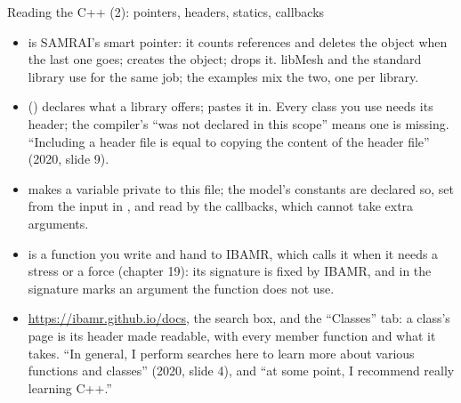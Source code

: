 \documentclass[aspectratio=169,11pt]{beamer}
\begin{document}
\begin{frame}{Reading the C++ (2): pointers, headers, statics, callbacks}
\label{fr:cpp2}
\footnotesize
\begin{itemize}
  \item {} is SAMRAI's smart pointer: it counts references and deletes the object when the last one goes;  creates the object;  drops it. libMesh and the standard library use  for the same job; the examples mix the two, one per library.
  \item {} () declares what a library offers;  pastes it in. Every class you use needs its header; the compiler's ``was not declared in this scope'' means one is missing. ``Including a header file is equal to copying the content of the header file'' (2020, slide 9).
  \item {} makes a variable private to this file; the model's constants are declared so, set from the input in , and read by the callbacks, which cannot take extra arguments.
  \item {} is a function you write and hand to IBAMR, which calls it when it needs a stress or a force (chapter 19): its signature is fixed by IBAMR, and  in the signature marks an argument the function does not use.
  \item {} \url{https://ibamr.github.io/docs}, the search box, and the ``Classes'' tab: a class's page is its header made readable, with every member function and what it takes. ``In general, I perform searches here to learn more about various functions and classes'' (2020, slide 4), and ``at some point, I recommend really learning C++.''
\end{itemize}
\end{frame}
\end{document}
